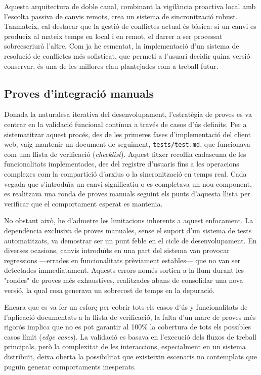 Aquesta arquitectura de doble canal, combinant la vigilància proactiva local amb l'escolta passiva de canvis remots, crea un sistema de sincronització robust. Tanmateix, cal destacar que la gestió de conflictes actual és bàsica: si un canvi es produeix al mateix temps en local i en remot, el darrer a ser processat sobreescriurà l'altre. Com ja he esmentat, la implementació d'un sistema de resolució de conflictes més sofisticat, que permeti a l'usuari decidir quina versió conservar, és una de les millores clau plantejades com a treball futur.

\subsection{Proves d'integració manuals}
Donada la naturalesa iterativa del desenvolupament, l'estratègia de proves es va centrar en la validació funcional contínua a través de casos d'ús definits. Per a sistematitzar aquest procés, des de les primeres fases d'implementació del client web, vaig mantenir un document de seguiment, \texttt{tests/test.md}, que funcionava com una llista de verificació (\textit{checklist}). Aquest fitxer recollia cadascuna de les funcionalitats implementades, des del registre d'usuaris fins a les operacions complexes com la compartició d'arxius o la sincronització en temps real. Cada vegada que s'introduïa un canvi significatiu o es completava un nou component, es realitzava una ronda de proves manuals seguint els punts d'aquesta llista per verificar que el comportament esperat es mantenia.

No obstant això, he d'admetre les limitacions inherents a aquest enfocament. La dependència exclusiva de proves manuales, sense el suport d'un sistema de tests automatitzats, va demostrar ser un punt feble en el cicle de desenvolupament. En diverses ocasions, canvis introduïts en una part del sistema van provocar regressions —errades en funcionalitats prèviament estables— que no van ser detectades immediatament. Aquests errors només sortien a la llum durant les "rondes" de proves més exhaustives, realitzades abans de consolidar una nova versió, la qual cosa generava un sobrecost de temps en la depuració.

Encara que es va fer un esforç per cobrir tots els casos d'ús y funcionalitats de l'aplicació documentats a la llista de verificació, la falta d'un marc de proves més rigorós implica que no es pot garantir al 100\% la cobertura de tots els possibles casos límit (\textit{edge cases}). La validació es basava en l'execució dels fluxos de treball principals, però la complexitat de les interaccions, especialment en un sistema distribuït, deixa oberta la possibilitat que existeixin escenaris no contemplats que puguin generar comportaments inesperats.

